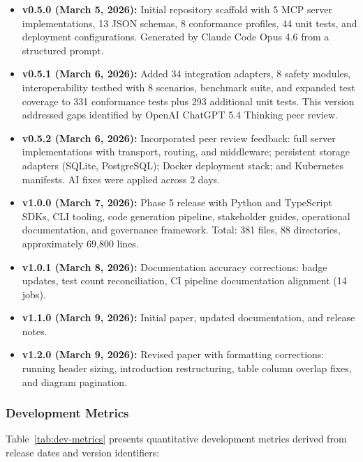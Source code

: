 \documentclass{article}
\begin{document}
\begin{itemize}[leftmargin=*]
\item \textbf{v0.5.0 (March 5, 2026):} Initial repository scaffold with 5 MCP server implementations, 13 JSON schemas, 8 conformance profiles, 44 unit tests, and deployment configurations. Generated by Claude Code Opus 4.6 from a structured prompt.

\item \textbf{v0.5.1 (March 6, 2026):} Added 34 integration adapters, 8 safety modules, interoperability testbed with 8 scenarios, benchmark suite, and expanded test coverage to 331 conformance tests plus 293 additional unit tests. This version addressed gaps identified by OpenAI ChatGPT 5.4 Thinking peer review.

\item \textbf{v0.5.2 (March 6, 2026):} Incorporated peer review feedback: full server implementations with transport, routing, and middleware; persistent storage adapters (SQLite, PostgreSQL); Docker deployment stack; and Kubernetes manifests. AI fixes were applied across 2 days.

\item \textbf{v1.0.0 (March 7, 2026):} Phase 5 release with Python and TypeScript SDKs, CLI tooling, code generation pipeline, stakeholder guides, operational documentation, and governance framework. Total: 381 files, 88 directories, approximately 69,800 lines.

\item \textbf{v1.0.1 (March 8, 2026):} Documentation accuracy corrections: badge updates, test count reconciliation, CI pipeline documentation alignment (14 jobs).

\item \textbf{v1.1.0 (March 9, 2026):} Initial paper, updated documentation, and release notes.

\item \textbf{v1.2.0 (March 9, 2026):} Revised paper with formatting corrections: running header sizing, introduction restructuring, table column overlap fixes, and diagram pagination.
\end{itemize}

\subsubsection{Development Metrics}

Table~\ref{tab:dev-metrics} presents quantitative development metrics derived from release dates and version identifiers:
\end{document}

